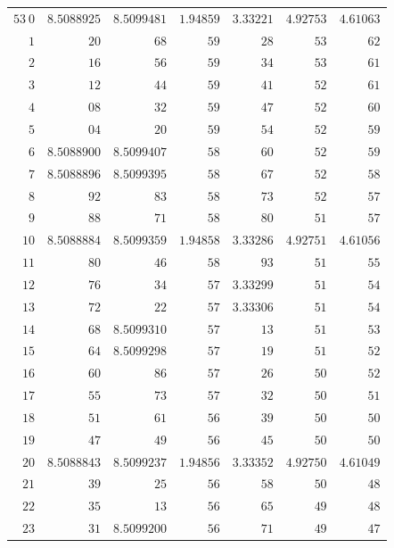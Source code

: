 \begin{center}
\begin{tabular}{||r||r|r|r|r|r|r||}
\(53\ 0\) & \(8.5088925\) & \(8.5099481\) & \(1.94859\) & \(3.33221\) & \(4.92753\) & \(4.61063\)\\
\(1\) & \(20\) & \(68\) & \(59\) & \(28\) & \(53\) & \(62\)\\
\(2\) & \(16\) & \(56\) & \(59\) & \(34\) & \(53\) & \(61\)\\
\(3\) & \(12\) & \(44\) & \(59\) & \(41\) & \(52\) & \(61\)\\
\(4\) & \(08\) & \(32\) & \(59\) & \(47\) & \(52\) & \(60\)\\
\(5\) & \(04\) & \(20\) & \(59\) & \(54\) & \(52\) & \(59\)\\
\(6\) & \(8.5088900\) & \(8.5099407\) & \(58\) & \(60\) & \(52\) & \(59\)\\
\(7\) & \(8.5088896\) & \(8.5099395\) & \(58\) & \(67\) & \(52\) & \(58\)\\
\(8\) & \(92\) & \(83\) & \(58\) & \(73\) & \(52\) & \(57\)\\
\(9\) & \(88\) & \(71\) & \(58\) & \(80\) & \(51\) & \(57\)\\[3pt]
\(10\) & \(8.5088884\) & \(8.5099359\) & \(1.94858\) & \(3.33286\) & \(4.92751\) & \(4.61056\)\\
\(11\) & \(80\) & \(46\) & \(58\) & \(93\) & \(51\) & \(55\)\\
\(12\) & \(76\) & \(34\) & \(57\) & \(3.33299\) & \(51\) & \(54\)\\
\(13\) & \(72\) & \(22\) & \(57\) & \(3.33306\) & \(51\) & \(54\)\\
\(14\) & \(68\) & \(8.5099310\) & \(57\) & \(13\) & \(51\) & \(53\)\\
\(15\) & \(64\) & \(8.5099298\) & \(57\) & \(19\) & \(51\) & \(52\)\\
\(16\) & \(60\) & \(86\) & \(57\) & \(26\) & \(50\) & \(52\)\\
\(17\) & \(55\) & \(73\) & \(57\) & \(32\) & \(50\) & \(51\)\\
\(18\) & \(51\) & \(61\) & \(56\) & \(39\) & \(50\) & \(50\)\\
\(19\) & \(47\) & \(49\) & \(56\) & \(45\) & \(50\) & \(50\)\\[3pt]
\(20\) & \(8.5088843\) & \(8.5099237\) & \(1.94856\) & \(3.33352\) & \(4.92750\) & \(4.61049\)\\
\(21\) & \(39\) & \(25\) & \(56\) & \(58\) & \(50\) & \(48\)\\
\(22\) & \(35\) & \(13\) & \(56\) & \(65\) & \(49\) & \(48\)\\
\(23\) & \(31\) & \(8.5099200\) & \(56\) & \(71\) & \(49\) & \(47\)\\

\end{tabular}
\end{center}
